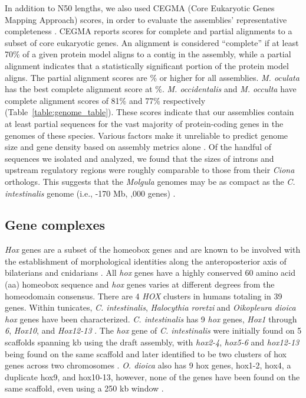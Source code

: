 In addition to N50 lengths, we also used CEGMA (Core Eukaryotic Genes Mapping Approach) scores, in order to evaluate the assemblies' representative completeness \cite{parra_cegma:_2007}. CEGMA reports scores for complete and partial alignments to a subset of core eukaryotic genes. An alignment is considered ``complete'' if at least 70\% of a given protein model aligns to a contig in the assembly, while a partial alignment indicates that a statistically significant portion of the protein model aligns. The partial alignment scores are \% or higher for all assemblies. \textit{M. oculata} has the best complete alignment score at \%. \textit{M. occidentalis} and \textit{M. occulta} have complete alignment scores of 81\% and 77\% respectively (Table~\ref{table:genome_table}). These scores indicate that our assemblies contain at least partial sequences for the vast majority of protein-coding genes in the genomes of these species.
Various factors make it unreliable to predict genome size and gene density based on assembly metrics alone \cite{bradnam_assemblathon_2013}. Of the handful of sequences we isolated and analyzed, we found that the sizes of introns and upstream regulatory regions were roughly comparable to those from their \textit{Ciona} orthologs. This suggests that the \textit{Molgula} genomes may be as compact as the \textit{C. intestinalis} genome (i.e., -170 Mb, ,000 genes) \cite{laird_chromatid_1971,simmen_gene_1998,satou_improved_2008}.

\subsection{Gene complexes}
\textit{Hox} genes are a subset of the homeobox genes and are known to be involved with the establishment of morphological identities along the anteroposterior axis of bilaterians and cnidarians \cite{finnerty_origins_2003}. All \textit{hox} genes have a highly conserved 60 amino acid (aa) homeobox sequence \cite{mcginnis_homologous_1984,gehring_homeodomain-dna_1994} and \textit{hox} genes varies at different degrees from the homeodomain consensus. There are 4 \textit{HOX} clusters in humans totaling in 39 genes. Within tunicates, \textit{C. intestinalis}, \textit{Halocythia roretzi} and \textit{Oikopleura dioica} \textit{hox} genes have been characterized. \textit{C. intestinalis} has 9 \textit{hox} genes, \textit{Hox1} through \textit{6}, \textit{Hox10}, and \textit{Hox12-13} \cite{dehal_draft_2002}. The \textit{hox} gene of \textit{C. intestinalis} were initially found on 5 scaffolds spanning  kb using the draft assembly, with \textit{hox2-4}, \textit{hox5-6} and \textit{hox12-13} being found on the same scaffold and later identified to be two clusters of hox genes across two chromosomes \cite{ikuta_ciona_2004}. \textit{O. dioica} also has 9 hox genes, hox1-2, hox4, a duplicate hox9, and hox10-13, however, none of the genes have been found on the same scaffold, even using a 250 kb window \cite{siok_biological_2004}. 

